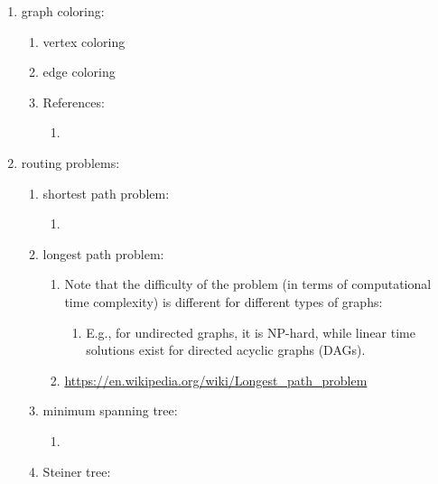 \begin{enumerate} \itemsep -4pt
\item graph coloring: \vspace{-0.3cm}
	\begin{enumerate} \itemsep -2pt
	\item vertex coloring
	\item edge coloring
	\item References: \vspace{-0.2cm}
		\begin{enumerate} \itemsep -2pt
		\item 
		\end{enumerate}
	\end{enumerate}
\item routing problems: \vspace{-0.3cm}
	\begin{enumerate} \itemsep -2pt
	\item shortest path problem: \vspace{-0.2cm}
		\begin{enumerate} \itemsep -2pt
		\item 
		\end{enumerate}
	\item longest path problem: \vspace{-0.2cm}
		\begin{enumerate} \itemsep -2pt
		\item Note that the difficulty of the problem (in terms of computational time complexity) is different for different types of graphs: \vspace{-0.1cm}
			\begin{enumerate} \itemsep -1pt
			\item E.g., for undirected graphs, it is NP-hard, while linear time solutions exist for directed acyclic graphs (DAGs).
			\end{enumerate}
		\item \url{https://en.wikipedia.org/wiki/Longest_path_problem}
		\end{enumerate}
	\item minimum spanning tree: \vspace{-0.2cm}
		\begin{enumerate} \itemsep -2pt
		\item 
		\end{enumerate}
	\item Steiner tree: \vspace{-0.2cm}
		\begin{enumerate} \itemsep -2pt

\end{enumerate}
\end{enumerate}
\end{enumerate}

